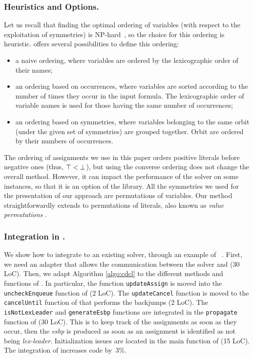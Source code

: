 \subsubsection{Heuristics and Options.} Let us recall that finding the optimal
ordering of variables (with respect to the exploitation of symmetries) is
NP-hard~\cite{luks.04.amai}, so the choice for this ordering is heuristic.
\libdsb{} offers several possibilities to define this ordering:
\begin{itemize}
 
 \item a naive ordering, where variables are ordered by the lexicographic
 order of their names;
 
 \item an ordering based on occurrences, where variables are sorted
 according to the number of times they occur in the input formula. The
 lexicographic order of variable names is used for those having the same number of
 occurrences;
 
 \item an ordering based on symmetries, where variables belonging to the
 same orbit (under the given set of symmetries) are grouped together. Orbit are
 ordered by their numbers of occurrences.
 
\end{itemize}
The ordering of assignments we use in this paper orders positive literals
before negative ones (thus, $\top < \bot$), but using the converse
ordering does not change the overall method. However, it can impact the
performance of the solver on some instances, so that it is an option of the
library.
All the symmetries we used for the presentation of our approach are
permutations of variables. Our method straightforwardly extends to permutations of literals, also known as \emph{value permutations} \cite{biere2009handbook}.



\subsubsection{Integration in \minisat{}.} We show how to integrate \libdsb{}
to an existing solver, through an example of \minisat{}~\cite{een2003extensible}.
First, we need an adapter that allows the communication between the solver and
\libdsb{} (30 LoC). Then, we adapt Algorithm \ref{algo:cdcl} to the different
methods and functions of \minisat{}. In particular, the function
\texttt{updateAssign} is moved into the \texttt{uncheckEnqueue} function of
\minisat{} (2 LoC). The \texttt{updateCancel} function is moved to the
\texttt{cancelUntil} function of \minisat{} that performs the backjumps (2
LoC). The \texttt{isNotLexLeader} and \texttt{generateEsbp} functions are
integrated in the \texttt{propagate} function of \minisat{} (30 LoC). This is
to keep track of the assignments as soon as they occur, then the
\textit{esbp} is produced as soon as an assignment is identified as not being
\emph{lex-leader}. Initialization issues are located in the main function of
\minisat (15 LoC).
The integration of \libdsb{} increases \minisat{} code by~3\%.
 
